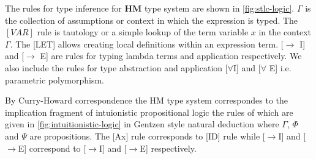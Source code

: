 The rules for type inference for \textbf{HM} type system are shown in \cref{fig:stlc-logic}. $\Gamma$ is the
collection of assumptions or context in which the expression is typed. The $[VAR]$ rule is tautology or a simple
lookup of the term variable $x$ in the context $\Gamma$. The [LET] allows creating local
definitions within an expression term. [$\rightarrow$ I] and [$\rightarrow$ E] are rules
for typing lambda terms and application respectively. We also include the rules for
type abstraction and application [$\forall$I] and [$\forall$ E] i.e. parametric polymorphism.

By Curry-Howard correspondence the HM type system correspondes to the implication fragment of intuionistic propositional logic
the rules of which are given in \cref{fig:intuitionistic-logic} in Gentzen style natural deduction
where $\Gamma$, $\Phi$ and $\Psi$ are propositions. The [Ax] rule corresponds to [ID] rule while [$\rightarrow$I] and [$\rightarrow$E] correspond
to [$\rightarrow$I] and [$\rightarrow$E] respectively.

